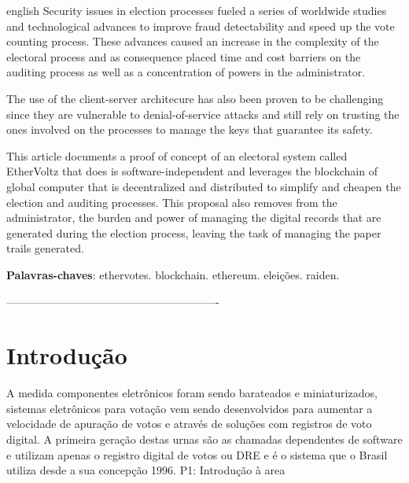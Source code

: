 \documentclass[
	article,			%
	11pt,				%
	oneside,			%
	a4paper,			%
	english,			%
	brazil,				%
	sumario=tradicional
	]{abntex2}
\begin{document}
\renewcommand{\resumoname}{Abstract}
\begin{resumoumacoluna}
	\begin{otherlanguage*}{english}
		Security issues in election processes fueled a series of worldwide studies and technological advances to improve fraud detectability and speed up the vote counting process. These advances caused an increase in the complexity of the electoral process and as consequence placed time and cost barriers on the auditing process as well as a concentration of powers in the administrator.
		
		The use of the client-server architecure has also been proven to be challenging since they are vulnerable to denial-of-service attacks and still rely on trusting the ones involved on the processes to manage the keys that guarantee its safety.
		
		This article documents a proof of concept of an electoral system called EtherVoltz that does is software-independent and leverages the blockchain of global computer that is decentralized and distributed to simplify and cheapen the election and auditing processes. This proposal also removes from the administrator, the burden and power of managing the digital records that are generated during the election process, leaving the task of managing the paper trails generated.
		
		\vspace{\onelineskip}
		
		\noindent
     	\textbf{Palavras-chaves}: ethervotes. blockchain. ethereum. eleições. raiden.
	\end{otherlanguage*}  
\end{resumoumacoluna}

\textual

 ----------------------------------------------------------
\section{Introdução}

A medida componentes eletrônicos foram sendo barateados e miniaturizados, sistemas eletrônicos para votação vem sendo desenvolvidos para aumentar a velocidade de apuração de votos e através de soluções com registros de voto digital. A primeira geração destas urnas são as chamadas dependentes de software e utilizam apenas o registro digital de votos ou DRE e é o sistema que o Brasil utiliza desde a sua concepção 1996. {P1: Introdução à area}
\end{document}
